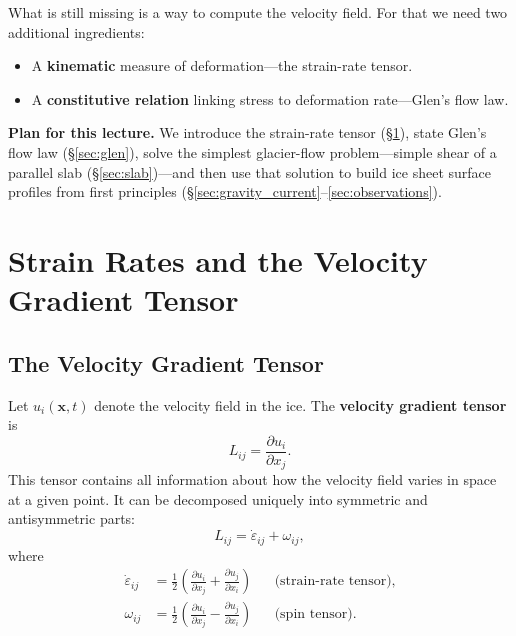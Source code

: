 \documentclass[11pt]{article}
\begin{document}
\noindent What is still missing is a way to compute the velocity field.  For that we need two additional ingredients:
\begin{itemize}
  \item A \textbf{kinematic} measure of deformation---the strain-rate tensor.
  \item A \textbf{constitutive relation} linking stress to deformation rate---Glen's flow law.
\end{itemize}

\noindent\textbf{Plan for this lecture.}  We introduce the strain-rate tensor (\S\ref{sec:strainrate}), state Glen's flow law (\S\ref{sec:glen}), solve the simplest glacier-flow problem---simple shear of a parallel slab (\S\ref{sec:slab})---and then use that solution to build ice sheet surface profiles from first principles (\S\ref{sec:gravity_current}--\ref{sec:observations}).

\section{Strain Rates and the Velocity Gradient Tensor}
\label{sec:strainrate}

\subsection{The Velocity Gradient Tensor}

Let $u_i(\bm{x},t)$ denote the velocity field in the ice.  The \textbf{velocity gradient tensor} is
\begin{equation}
  L_{ij} = \frac{\partial u_i}{\partial x_j}.
\end{equation}
This tensor contains all information about how the velocity field varies in space at a given point.  It can be decomposed uniquely into symmetric and antisymmetric parts:
\begin{equation}
  L_{ij} = \dot{\varepsilon}_{ij} + \omega_{ij},
\end{equation}
where
\begin{align}
  \dot{\varepsilon}_{ij} &= \tfrac{1}{2}\!\left(\frac{\partial u_i}{\partial x_j} + \frac{\partial u_j}{\partial x_i}\right) & &\text{(strain-rate tensor)}, \\[6pt]
  \omega_{ij} &= \tfrac{1}{2}\!\left(\frac{\partial u_i}{\partial x_j} - \frac{\partial u_j}{\partial x_i}\right) & &\text{(spin tensor)}.
\end{align}
\end{document}
